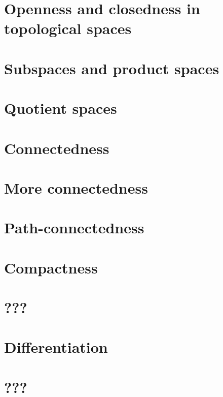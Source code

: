 \documentclass{article}
\begin{document}
\section{Openness and closedness in topological spaces}

\section{Subspaces and product spaces}

\section{Quotient spaces}

\section{Connectedness}

\section{More connectedness}

\section{Path-connectedness}

\section{Compactness}

\section{???}

\section{Differentiation}

\section{???}

\end{document}
